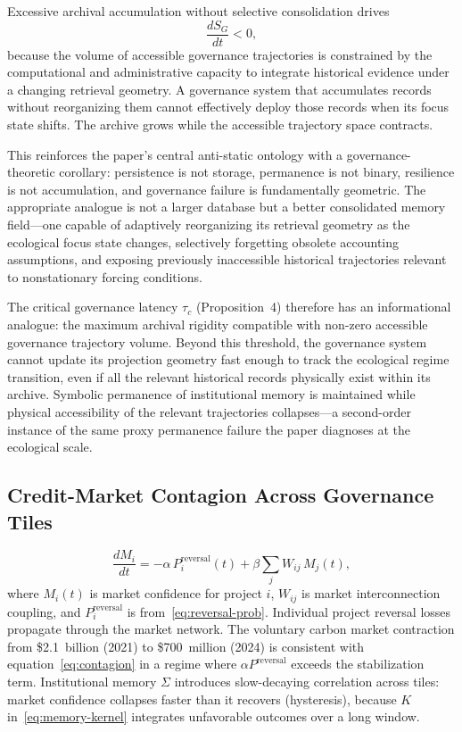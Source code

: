 \documentclass[12pt]{article}
\begin{document}
Excessive archival accumulation without selective consolidation drives
\begin{equation}
\label{eq:gov-entropy-decay}
\frac{dS_G}{dt} < 0,
\end{equation}
because the volume of accessible governance trajectories is constrained by the
computational and administrative capacity to integrate historical evidence under a
changing retrieval geometry. A governance system that accumulates records without
reorganizing them cannot effectively deploy those records when its focus state shifts.
The archive grows while the accessible trajectory space contracts.

This reinforces the paper's central anti-static ontology with a governance-theoretic
corollary: persistence is not storage, permanence is not binary, resilience is not
accumulation, and governance failure is fundamentally geometric. The appropriate
analogue is not a larger database but a better consolidated memory field---one capable
of adaptively reorganizing its retrieval geometry as the ecological focus state changes,
selectively forgetting obsolete accounting assumptions, and exposing previously
inaccessible historical trajectories relevant to nonstationary forcing conditions.

The critical governance latency $\tau_c$ (Proposition~4) therefore has an informational
analogue: the maximum archival rigidity compatible with non-zero accessible governance
trajectory volume. Beyond this threshold, the governance system cannot update its
projection geometry fast enough to track the ecological regime transition, even if all
the relevant historical records physically exist within its archive. Symbolic permanence
of institutional memory is maintained while physical accessibility of the relevant
trajectories collapses---a second-order instance of the same proxy permanence failure
the paper diagnoses at the ecological scale.

\subsection{Credit-Market Contagion Across Governance Tiles}

\begin{equation}
\label{eq:contagion}
\frac{dM_i}{dt}
= -\alpha\,P_i^\text{reversal}(t)
+ \beta\sum_j W_{ij}\,M_j(t),
\end{equation}
where $M_i(t)$ is market confidence for project $i$, $W_{ij}$ is market interconnection
coupling, and $P_i^\text{reversal}$ is from~\eqref{eq:reversal-prob}. Individual project
reversal losses propagate through the market network. The voluntary carbon market
contraction from \$2.1~billion (2021) to \$700~million (2024) is consistent with
equation~\eqref{eq:contagion} in a regime where $\alpha P^\text{reversal}$ exceeds the
stabilization term. Institutional memory $\Sigma$ introduces slow-decaying correlation
across tiles: market confidence collapses faster than it recovers (hysteresis), because
$K$ in~\eqref{eq:memory-kernel} integrates unfavorable outcomes over a long window.
\end{document}
